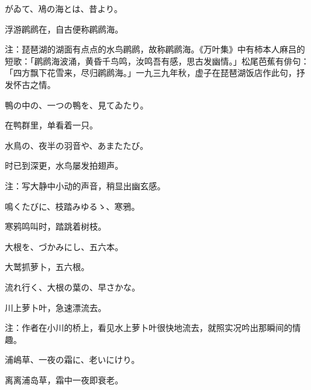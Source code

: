 \begin{haiku}
    {\FH {}がゐて、鳰の海とは、昔より。}

    {\FK 浮游䴙䴘在，自古便称䴙䴘海。}

    {\FT 注：琵琶湖的湖面有点点的水鸟䴙䴘，故称䴙䴘海。《万叶集》中有柿本人麻吕的短歌：「䴙䴘海波涌，黄昏千鸟鸣，汝鸣吾有感，思古发幽情。」松尾芭蕉有俳句：「四方飘下花雪来，尽归䴙䴘海。」一九三九年秋，虚子在琵琶湖饭店作此句，抒发怀古之情。}
\end{haiku}

\begin{haiku}
    {\FH 鴨の中の、一つの鴨を、見てゐたり。}

    {\FK 在鸭群里，单看着一只。}
\end{haiku}

\begin{haiku}
    {\FH 水鳥の、夜半の羽音や、あまたたび。}

    {\FK 时已到深更，水鸟屡发拍翅声。}

    {\FT 注：写大静中小动的声音，稍显出幽玄感。}
\end{haiku}

\begin{haiku}
    {\FH 鳴くたびに、枝踏みゆるゝ、寒鴉。}

    {\FK 寒鸦鸣叫时，踏跳着树枝。}
\end{haiku}

\begin{haiku}
    {\FH 大根を、づかみにし、五六本。}

    {\FK 大鹫抓萝卜，五六根。}
\end{haiku}

\begin{haiku}
    {\FH 流れ行く、大根の葉の、早さかな。}

    {\FK 川上萝卜叶，急速漂流去。}

    {\FT 注：作者在小川的桥上，看见水上萝卜叶很快地流去，就照实况吟出那瞬间的情趣。}
\end{haiku}

\begin{haiku}
    {\FH 浦嶋草、一夜の霜に、老いにけり。}

    {\FK 离离浦岛草，霜中一夜即衰老。}
\end{haiku}

\chapter[{\FM 水原秋櫻子}]{\FM {}}

